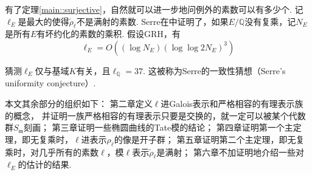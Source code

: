 有了定理\ref{main::surjective}，自然就可以进一步地问例外的素数可以有多少个.
记$\ell_{E}$是最大的使得$\tilde{\rho}_{\ell}$不是满射的素数.
Serre在\parencite{serre1981quelques}中证明了，如果$E/\mathbb{Q}$没有复乘，记$N_E$是所有$E$有坏约化的素数的乘积.
假设GRH，有
\begin{equation}
    \ell_{E} = O((\log N_E)(\log \log 2N_E)^3)
\end{equation}

猜测$\ell_{E}$仅与基域$K$有关，且$\ell_{\mathbb{Q}}=37$.
这被称为Serre的一致性猜想（Serre's uniformity conjecture）.

本文其余部分的组织如下：
第二章定义$\ell$进Galois表示和严格相容的有理表示族的概念，
并证明一族严格相容的有理表示只要是交换的，就一定可以被某个代数群$S_{\mathfrak{m}}$刻画；
第三章证明一些椭圆曲线的Tate模的结论；
第四章证明第一个主定理，即无复乘时，$\ell$进表示$\rho_{\ell}$的像是开子群；
第五章证明第二个主定理，即无复乘时，对几乎所有的素数$\ell$，模$\ell$表示$\tilde{\rho}_{\ell}$是满射；
第六章不加证明地介绍一些对$\ell_{E}$的估计的结果.
